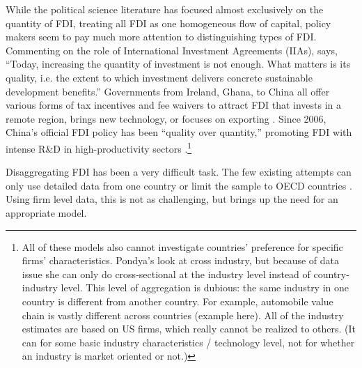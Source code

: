 While the political science literature has focused almost exclusively on the quantity of FDI, treating all FDI as one homogeneous flow of capital, policy makers seem to pay much more attention to distinguishing types of FDI. Commenting on the role of International Investment Agreements (IIAs), \citet{UNCTAD2015} says, ``Today, increasing the quantity of investment is not enough. What matters is its quality, i.e. the extent to which investment delivers concrete sustainable development benefits.'' Governments from Ireland, Ghana, to China all offer various forms of tax incentives and fee waivers to attract FDI that invests in a remote region, brings new technology, or focuses on exporting \citep{Ricupero2000}. Since 2006, China's official FDI policy has been ``quality over quantity,'' promoting FDI with intense R\&D in high-productivity sectors \citep{Guangzhou2011}.\footnote{All of these models also cannot investigate countries' preference for specific firms' characteristics. Pondya's look at cross industry, but because of data issue she can only do cross-sectional at the industry level instead of country-industry level. This level of aggregation is dubious: the same industry in one country is different from another country. For example, automobile value chain is vastly different across countries (example here). All of the industry estimates are based on US firms, which really cannot be realized to others. (It can for some basic industry characteristics / technology level, not for whether an industry is market oriented or not.)}

Disaggregating FDI has been a very difficult task. The few existing attempts can only use detailed data from one country or limit the sample to OECD countries \citep{Alfaro2003, Alfaro2007, Javorcik2004}. Using firm level data, this is not as challenging, but brings up the need for an appropriate model.

